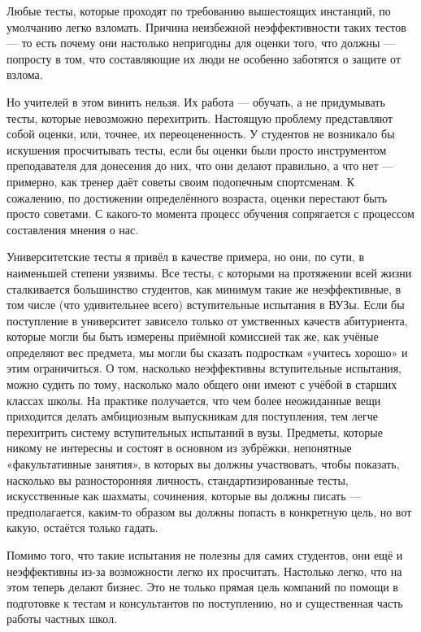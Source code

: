 \documentclass[ebook,12pt,oneside,openany]{memoir}
\begin{document}
Любые тесты, которые проходят по требованию вышестоящих инстанций, по
умолчанию легко взломать. Причина неизбежной неэффективности таких
тестов — то есть почему они настолько непригодны для оценки того, что
должны — попросту в том, что составляющие их люди не особенно
заботятся о защите от взлома. \newline

Но учителей в этом винить нельзя. Их работа — обучать, а не
придумывать тесты, которые невозможно перехитрить. Настоящую проблему
представляют собой оценки, или, точнее, их переоцененность. У
студентов не возникало бы искушения просчитывать тесты, если бы оценки
были просто инструментом преподавателя для донесения до них, что они
делают правильно, а что нет — примерно, как тренер даёт советы своим
подопечным спортсменам. К сожалению, по достижении определённого
возраста, оценки перестают быть просто советами. С какого-то момента
процесс обучения сопрягается с процессом составления мнения о нас. \newline

Университетские тесты я привёл в качестве примера, но они, по сути, в
наименьшей степени уязвимы. Все тесты, с которыми на протяжении всей
жизни сталкивается большинство студентов, как минимум такие же
неэффективные, в том числе (что удивительнее всего) вступительные
испытания в ВУЗы. Если бы поступление в университет зависело только от
умственных качеств абитуриента, которые могли бы быть измерены
приёмной комиссией так же, как учёные определяют вес предмета, мы
могли бы сказать подросткам «учитесь хорошо» и этим ограничиться. О
том, насколько неэффективны вступительные испытания, можно судить по
тому, насколько мало общего они имеют с учёбой в старших классах
школы. На практике получается, что чем более неожиданные вещи
приходится делать амбициозным выпускникам для поступления, тем легче
перехитрить систему вступительных испытаний в вузы. Предметы, которые
никому не интересны и состоят в основном из зубрёжки, непонятные
«факультативные занятия», в которых вы должны участвовать, чтобы
показать, насколько вы разносторонняя личность, стандартизированные
тесты, искусственные как шахматы, сочинения, которые вы должны писать
— предполагается, каким-то образом вы должны попасть в конкретную
цель, но вот какую, остаётся только гадать. \newline

Помимо того, что такие испытания не полезны для самих студентов, они
ещё и неэффективны из-за возможности легко их просчитать. Настолько
легко, что на этом теперь делают бизнес. Это не только прямая цель
компаний по помощи в подготовке к тестам и консультантов по
поступлению, но и существенная часть работы частных школ. \newline
\end{document}
